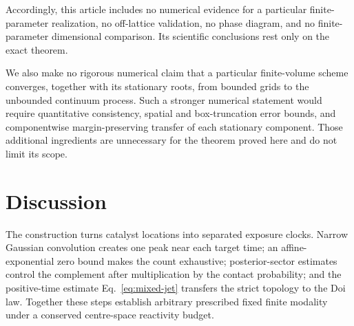 \documentclass{iopjournal}
\theoremstyle{plain}
\theoremstyle{definition}
\begin{document}
Accordingly, this article includes no numerical evidence for a particular
finite-parameter realization, no off-lattice validation, no phase diagram,
and no finite-parameter dimensional comparison.  Its scientific conclusions
rest only on the exact theorem.

We also make no rigorous numerical claim that a particular finite-volume
scheme converges, together with its stationary roots, from bounded grids to
the unbounded continuum process.  Such a stronger numerical statement would
require quantitative consistency, spatial and box-truncation error bounds,
and componentwise margin-preserving transfer of each stationary component.
Those additional ingredients are unnecessary for the theorem proved here and
do not limit its scope.

%
%

\section{Discussion}
\label{sec:discussion}

The construction turns catalyst locations into separated exposure clocks.
Narrow Gaussian convolution creates one peak near each target time; an
affine-exponential zero bound makes the count exhaustive; posterior-sector
estimates control the complement after multiplication by the contact
probability; and the positive-time estimate
Eq.~\eqref{eq:mixed-jet} transfers the strict topology to the Doi law.
Together these steps establish arbitrary prescribed fixed finite modality
under a conserved centre-space reactivity budget.
\end{document}
